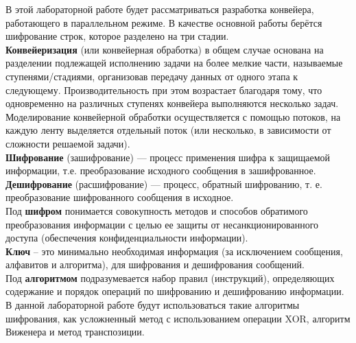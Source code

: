 В этой лабораторной работе будет рассматриваться разработка конвейера, работающего в параллельном режиме. В качестве основной работы берётся шифрование строк, которое разделено на три стадии. \\

\textbf{Конвейеризация} (или конвейерная обработка) в общем случае основана на разделении подлежащей исполнению задачи на более мелкие части, называемые ступенями/стадиями, организовав передачу данных от одного этапа к следующему.  Производительность при этом возрастает благодаря тому, что одновременно на различных ступенях конвейера выполняются несколько задач. \cite{Conveyor}\\

Моделирование конвейерной обработки осуществляется с помощью потоков, на каждую ленту выделяется отдельный поток (или несколько, в зависимости от сложности решаемой задачи).\\

\textbf{Шифрование} (зашифрование) — процесс применения шифра к защищаемой информации, т.е. преобразование исходного сообщения в зашифрованное.\\

\textbf{Дешифрование} (расшифрование) — процесс, обратный шифрованию, т. е. преобразование шифрованного сообщения в исходное.\\

Под \textbf{шифром} понимается совокупность методов и способов обратимого преобразования информации с целью ее защиты от несанкционированного доступа (обеспечения конфиденциальности информации).\\

\textbf{Ключ} – это минимально необходимая информация (за исключением сообщения, алфавитов и алгоритма), для шифрования и дешифрования сообщений.\\

Под \textbf{алгоритмом} подразумевается набор правил (инструкций), определяющих содержание и порядок операций по шифрованию и дешифрованию информации.\\

В данной лабораторной работе будут использоваться такие алгоритмы шифрования, как усложненный метод с использованием операции XOR, алгоритм Виженера и метод транспозиции. 














